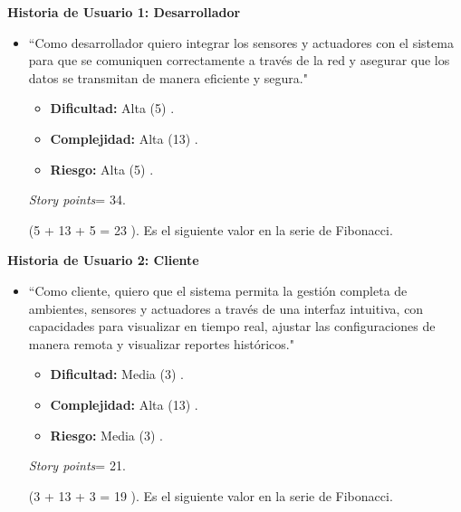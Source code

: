 \textbf{Historia de Usuario 1: Desarrollador}
\begin{itemize}
	\item ``Como desarrollador quiero integrar los sensores y actuadores con el sistema para que se comuniquen correctamente a través de la
	      red y asegurar que los datos se transmitan de manera eficiente y segura."

	      \begin{itemize}
		      \item \textbf{Dificultad:} Alta (5) .
		      \item \textbf{Complejidad:} Alta (13) .
		      \item \textbf{Riesgo:} Alta (5) .
	      \end{itemize}

	      \textit{Story points}= 34.

	      (5 + 13 + 5 = 23 ). Es el siguiente valor en la serie de Fibonacci.

\end{itemize}

\textbf{Historia de Usuario 2: Cliente}
\begin{itemize}
	\item ``Como cliente, quiero que el sistema permita la gestión completa de ambientes, sensores y actuadores a través de una interfaz intuitiva,
	      con capacidades para visualizar en tiempo real, ajustar las configuraciones de manera remota y visualizar
	      reportes históricos."

	      \begin{itemize}
		      \item \textbf{Dificultad:} Media (3) .
		      \item \textbf{Complejidad:} Alta (13) .
		      \item \textbf{Riesgo:} Media (3) .
	      \end{itemize}

	      \textit{Story points}= 21.

	      (3 + 13 + 3 = 19 ). Es el siguiente valor en la serie de Fibonacci.

\end{itemize}

